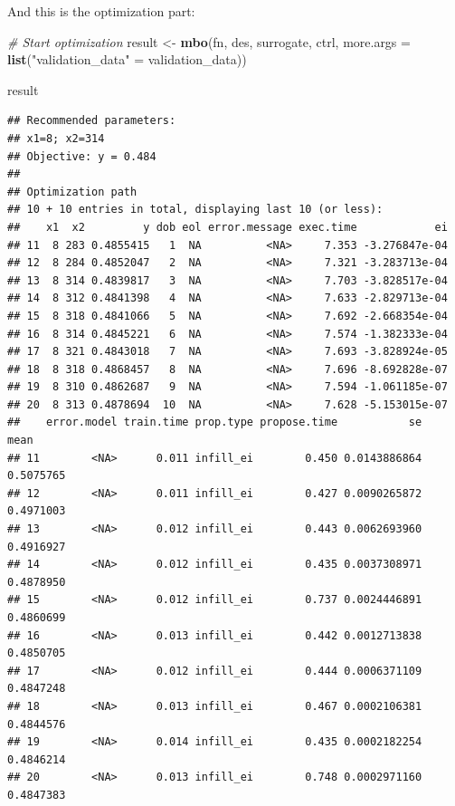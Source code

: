 \documentclass[]{gitbook}
\newenvironment{Shaded}{\begin{snugshade}}{\end{snugshade}}
\newcommand{\CommentTok}[1]{\textcolor[rgb]{0.56,0.35,0.01}{\textit{#1}}}
\newcommand{\DataTypeTok}[1]{\textcolor[rgb]{0.13,0.29,0.53}{#1}}
\newcommand{\KeywordTok}[1]{\textcolor[rgb]{0.13,0.29,0.53}{\textbf{#1}}}
\newcommand{\NormalTok}[1]{#1}
\newcommand{\StringTok}[1]{\textcolor[rgb]{0.31,0.60,0.02}{#1}}
\begin{document}
And this is the optimization part:

\begin{Shaded}
\begin{Highlighting}[]
\CommentTok{# Start optimization}
\NormalTok{result <-}\StringTok{ }\KeywordTok{mbo}\NormalTok{(fn, des, surrogate, ctrl, }\DataTypeTok{more.args =} \KeywordTok{list}\NormalTok{(}\StringTok{"validation_data"}\NormalTok{ =}\StringTok{ }\NormalTok{validation_data))}
\end{Highlighting}
\end{Shaded}

\begin{Shaded}
\begin{Highlighting}[]
\NormalTok{result}
\end{Highlighting}
\end{Shaded}

\begin{verbatim}
## Recommended parameters:
## x1=8; x2=314
## Objective: y = 0.484
## 
## Optimization path
## 10 + 10 entries in total, displaying last 10 (or less):
##    x1  x2         y dob eol error.message exec.time            ei
## 11  8 283 0.4855415   1  NA          <NA>     7.353 -3.276847e-04
## 12  8 284 0.4852047   2  NA          <NA>     7.321 -3.283713e-04
## 13  8 314 0.4839817   3  NA          <NA>     7.703 -3.828517e-04
## 14  8 312 0.4841398   4  NA          <NA>     7.633 -2.829713e-04
## 15  8 318 0.4841066   5  NA          <NA>     7.692 -2.668354e-04
## 16  8 314 0.4845221   6  NA          <NA>     7.574 -1.382333e-04
## 17  8 321 0.4843018   7  NA          <NA>     7.693 -3.828924e-05
## 18  8 318 0.4868457   8  NA          <NA>     7.696 -8.692828e-07
## 19  8 310 0.4862687   9  NA          <NA>     7.594 -1.061185e-07
## 20  8 313 0.4878694  10  NA          <NA>     7.628 -5.153015e-07
##    error.model train.time prop.type propose.time           se      mean
## 11        <NA>      0.011 infill_ei        0.450 0.0143886864 0.5075765
## 12        <NA>      0.011 infill_ei        0.427 0.0090265872 0.4971003
## 13        <NA>      0.012 infill_ei        0.443 0.0062693960 0.4916927
## 14        <NA>      0.012 infill_ei        0.435 0.0037308971 0.4878950
## 15        <NA>      0.012 infill_ei        0.737 0.0024446891 0.4860699
## 16        <NA>      0.013 infill_ei        0.442 0.0012713838 0.4850705
## 17        <NA>      0.012 infill_ei        0.444 0.0006371109 0.4847248
## 18        <NA>      0.013 infill_ei        0.467 0.0002106381 0.4844576
## 19        <NA>      0.014 infill_ei        0.435 0.0002182254 0.4846214
## 20        <NA>      0.013 infill_ei        0.748 0.0002971160 0.4847383
\end{verbatim}
\end{document}
